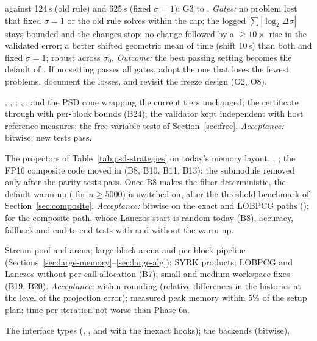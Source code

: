 \documentclass[11pt]{article}
\begin{document}
\begin{description}[style=nextline,leftmargin=0.6cm]
against 124\,s (old rule) and 625\,s (fixed $\sigma=1$); G3  to .
\emph{Gates:} no problem lost that fixed $\sigma=1$ or the old rule solves within the cap; the logged
$\sum|\log_2\Delta\sigma|$ stays bounded and the changes stop; no change followed by a $\ge10\times$ rise in the
validated error; a better shifted geometric mean of time (shift 10\,s) than both  and
fixed $\sigma = 1$; robust across $\sigma_0$. \emph{Outcome:} the best passing setting becomes the default
of . If no setting passes all gates, adopt the one that loses the fewest problems,
document the losses, and revisit the freeze design (O2, O8).
\item[Phase 5 --- Cone layer.] , , ; ,
, and the PSD cone wrapping the current tiers unchanged; the certificate through
 with per-block bounds (B24); the validator kept independent with host reference measures;
the free-variable tests of Section~\ref{sec:free}. \emph{Acceptance:} bitwise; new tests pass.
\item[Phase 6a --- PSD strategies, bit for bit.] The projectors of Table~\ref{tab:psd-strategies} on today's
memory layout, , ; the FP16 composite code moved in (B8, B10, B11,
B13); the submodule removed only after the parity tests pass. Once B8 makes the filter deterministic, the
default warm-up ( for $n\ge5000$) is switched on, after the threshold benchmark of
Section~\ref{sec:composite}. \emph{Acceptance:} bitwise on the exact and LOBPCG paths ();
for the composite path, whose Lanczos start is random today (B8), accuracy, fallback and end-to-end tests with
and without the warm-up.
\item[Phase 6b --- PSD memory model.] Stream pool and arena; large-block arena and per-block pipeline
(Sections~\ref{sec:large-memory}--\ref{sec:large-alg}); SYRK products; LOBPCG and Lanczos without per-call
allocation (B7); small and medium workspace fixes (B19, B20). \emph{Acceptance:} within rounding (relative
differences in the histories at the level of the projection error); measured peak memory within 5\% of the
setup plan; time per iteration not worse than Phase 6a.
\item[Phase 7 --- Linear systems.] The interface types (, , and
 with the inexact hooks); the backends  (bitwise),

\end{description}
\end{document}
